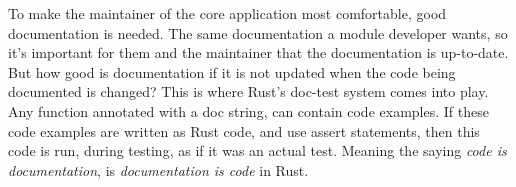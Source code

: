 To make the maintainer of the core application most comfortable, good
documentation is needed. The same documentation a module developer wants, so
it's important for them and the maintainer that the documentation is up-to-date.
But how good is documentation if it is not updated when the code being
documented is changed? This is where Rust's doc-test system comes into play. Any
function annotated with a doc string, can contain code examples. If these code
examples are written as Rust code, and use assert statements, then this code is
run, during testing, as if it was an actual test. Meaning the saying
\textit{code is documentation}, is \textit{documentation is code} in Rust.


